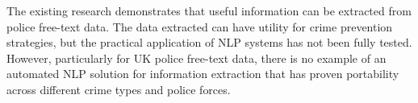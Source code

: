 The existing research demonstrates that useful information can be extracted from police free-text data. The data extracted can have utility for crime prevention strategies, but the practical application of NLP systems has not been fully tested. However, particularly for UK police free-text data, there is no example of an automated NLP solution for information extraction that has proven portability across different crime types and police forces.


